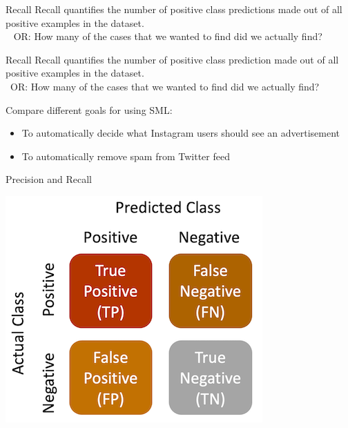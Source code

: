 \documentclass[compress]{beamer}
\begin{document}
\begin{frame}{Recall}
Recall quantifies the number of positive class predictions made out of all positive examples in the dataset. \\\
\pause
OR: How many of the cases that we wanted to find did we actually find?
\end{frame}


\begin{frame}{Recall}
Recall quantifies the number of positive class prediction made out of all positive examples in the dataset. \\\
OR: How many of the cases that we wanted to find did we actually find?
	
\begin{alertblock}{Compare different goals for using SML:}
\begin{itemize}
	\item To automatically decide what Instagram users should see an advertisement
	\item To automatically remove spam from Twitter feed
\end{itemize}
\end{alertblock}
\end{frame}

\begin{frame}{Precision and Recall}
\begin{center}
	\includegraphics[width=\linewidth,height=\textheight,keepaspectratio]{../pictures/confusionmatrix_words.png} \\\
\end{center}
\end{frame}
\end{document}
